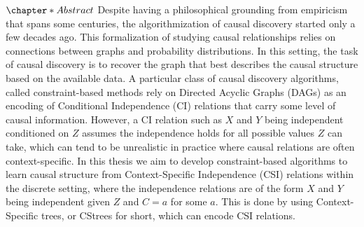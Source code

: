 \documentclass{tufte-book}
\author{nazaal}
\date{\today}
\title{}
\begin{document}
\setlength\parindent{0pt}
\setcounter{secnumdepth}{2}
\newcommand{\indep}{\perp \!\!\! \perp}

\let\cleardoublepage\clearpage

\(\chapter*{Abstract}\)
Despite having a philosophical grounding from empiricism that spans some centuries, the algorithmization of causal discovery started only a few decades ago. This formalization of studying causal relationships relies on connections between graphs and probability distributions. In this setting, the task of causal discovery is to recover the graph that best describes the causal structure based on the available data. A particular class of causal discovery algorithms, called constraint-based methods rely on Directed Acyclic Graphs (DAGs) as an encoding of Conditional Independence (CI) relations that carry some level of causal information. However, a CI relation such as \(X\) and \(Y\) being independent conditioned on \(Z\) assumes the independence holds for all possible values \(Z\) can take, which can tend to be unrealistic in practice where causal relations are often context-specific.  In this thesis we aim to develop constraint-based algorithms to learn causal structure from Context-Specific Independence (CSI) relations within the discrete setting, where the independence relations are of the form \(X\) and \(Y\) being independent given \(Z\) and \(C=a\) for some \(a\). This is done by using Context-Specific trees, or CStrees for short, which can encode CSI relations. 
\end{document}
